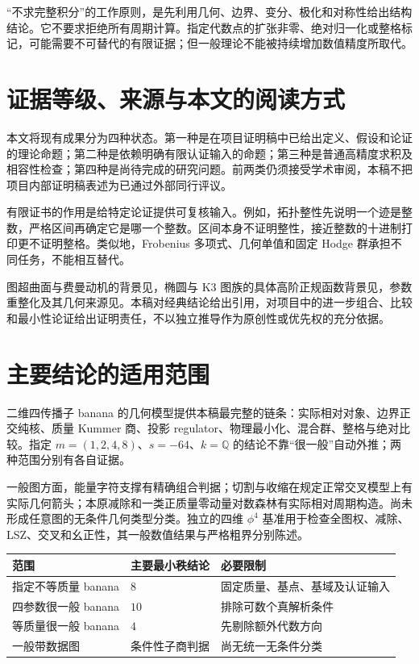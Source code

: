 \documentclass[11pt,a4paper,oneside]{ctexrep}
\theoremstyle{cnplain}
\theoremstyle{definition}
\theoremstyle{remark}
\newcommand{\Q}{\mathbb Q}
\begin{document}
``不求完整积分''的工作原则，是先利用几何、边界、变分、极化和对称性给出结构结论。它不要求拒绝所有周期计算。指定代数点的扩张非零、绝对归一化或整格标记，可能需要不可替代的有限证据；但一般理论不能被持续增加数值精度所取代。

\section{证据等级、来源与本文的阅读方式}
本文将现有成果分为四种状态。第一种是在项目证明稿中已给出定义、假设和论证的理论命题；第二种是依赖明确有限认证输入的命题；第三种是普通高精度求积及相容性检查；第四种是尚待完成的研究问题。前两类仍须接受学术审阅，本稿不把项目内部证明稿表述为已通过外部同行评议。

有限证书的作用是给特定论证提供可复核输入。例如，拓扑整性先说明一个迹是整数，严格区间再确定它是哪一个整数。区间本身不证明整性，接近整数的十进制打印更不证明整格。类似地，Frobenius 多项式、几何单值和固定 Hodge 群承担不同任务，不能相互替代。

图超曲面与费曼动机的背景见\cite{bek,browncosmic}，椭圆与 K3 图族的具体高阶正规函数背景见\cite{bv,bkv}，参数重整化及其几何来源见\cite{bk2008,bk2011,bk2012,bbr}。本稿对经典结论给出引用，对项目中的进一步组合、比较和最小性论证给出证明责任，不以独立推导作为原创性或优先权的充分依据。

\section{主要结论的适用范围}
二维四传播子 banana 的几何模型提供本稿最完整的链条：实际相对对象、边界正交纯核、质量 Kummer 商、投影 regulator、物理最小化、混合群、整格与绝对比较。指定 $m=(1,2,4,8)$、$s=-64$、$k=\Q$ 的结论不靠``很一般''自动外推；两种范围分别有各自证据。

一般图方面，能量字符支撑有精确组合判据；切割与收缩在规定正常交叉模型上有实际几何箭头；本原减除和一类正质量零动量对数森林有实际相对周期构造。尚未形成任意图的无条件几何类型分类。独立的四维 $\phi^4$ 基准用于检查全图权、减除、LSZ、交叉和幺正性，其一般数值结果与严格粗界分别陈述。

\begin{center}
\begin{tabular}{lll}
\toprule
范围 & 主要最小秩结论 & 必要限制\\
\midrule
指定不等质量 banana & $8$ & 固定质量、基点、基域及认证输入\\
四参数很一般 banana & $10$ & 排除可数个真解析条件\\
等质量很一般 banana & $4$ & 先剔除额外代数方向\\
一般带数据图 & 条件性子商判据 & 尚无统一无条件分类\\
\bottomrule
\end{tabular}
\end{center}
\end{document}
